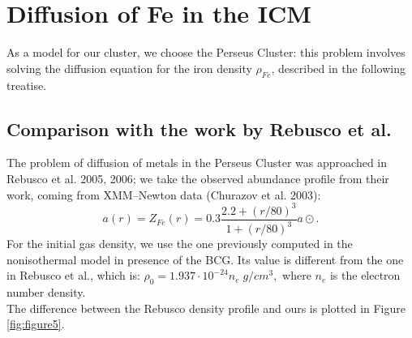 \documentclass{article}
\begin{document}
\newpage
\section{Diffusion of Fe in the ICM}
As a model for our cluster, we choose the Perseus Cluster: this problem involves solving the diffusion equation for the iron density \(\rho_{Fe}\), described in the following treatise. 

\subsection{Comparison with the work by Rebusco et al. }
The problem of diffusion of metals in the Perseus Cluster was approached in Rebusco et al. 2005, 2006; we take the observed abundance profile from their work, coming from XMM–Newton data (Churazov et al. 2003):
\begin{equation}
a(r)=Z_{Fe}(r)=0.3\frac{2.2+(r/80)^{3}}{1+(r/80)^{3}}a\odot .
\end{equation}
For the initial gas density, we use the one previously computed in the nonisothermal model in presence of the BCG. Its value is different from the one in Rebusco et al., which is: \(\rho_{0}=1.937 \cdot 10^{-24}n_{e}\; g/cm^{3},\) where \(n_{e}\) is the electron number density. \\
The difference between the Rebusco density profile and ours is plotted in Figure \ref{fig:figure5}. \\
\end{document}

